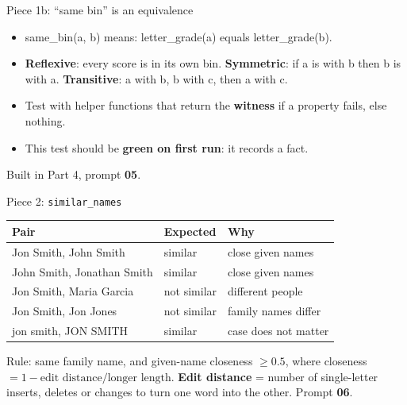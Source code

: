 \begin{frame}{Piece 1b: ``same bin'' is an equivalence}
\begin{itemize}
\item same\_bin(a, b) means: letter\_grade(a) equals letter\_grade(b).
\item \textbf{Reflexive}: every score is in its own bin. \textbf{Symmetric}: if a is with b then b is with a. \textbf{Transitive}: a with b, b with c, then a with c.
\item Test with helper functions that return the \textbf{witness} if a property fails, else nothing.
\item This test should be \textbf{green on first run}: it records a fact.
\end{itemize}
{\small Built in Part 4, prompt \textbf{05}.}
\end{frame}

\begin{frame}{Piece 2: \texttt{similar\_names}}
\begin{tabular}{@{}lll@{}}
\textbf{Pair} & \textbf{Expected} & \textbf{Why}\\\midrule
Jon Smith, John Smith & similar & close given names\\
John Smith, Jonathan Smith & similar & close given names\\
Jon Smith, Maria Garcia & not similar & different people\\
Jon Smith, Jon Jones & not similar & family names differ\\
jon smith, JON SMITH & similar & case does not matter\\
\end{tabular}
\vspace{4pt}

{\small Rule: same family name, and given-name closeness $\geq 0.5$, where closeness $= 1 - \text{edit distance}/\text{longer length}$. \textbf{Edit distance} = number of single-letter inserts, deletes or changes to turn one word into the other. Prompt \textbf{06}.}
\end{frame}

